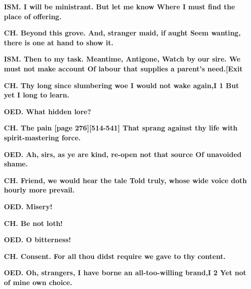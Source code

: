 \documentclass[11pt,letter]{book}
\begin{document}
\par \textbf{ISM. I will be ministrant. But let me know Where I must find the place of offering.}
\par 

\par \textbf{CH. Beyond this grove. And, stranger maid, if aught Seem wanting, there is one at hand to show it.}
\par 

\par \textbf{ISM. Then to my task. Meantime, Antigone, Watch by our sire. We must not make account Of labour that supplies a parent’s need.[Exit}
\par 

\par \textbf{CH. Thy long since slumbering woe I would not wake again,I 1 But yet I long to learn.}
\par 

\par \textbf{OED. What hidden lore?}
\par 

\par \textbf{CH. The pain [page 276][514-541] That sprang against thy life with spirit-mastering force.}
\par 

\par \textbf{OED. Ah, sirs, as ye are kind, re-open not that source Of unavoided shame.}
\par 

\par \textbf{CH. Friend, we would hear the tale Told truly, whose wide voice doth hourly more prevail.}
\par 

\par \textbf{OED. Misery!}
\par 

\par \textbf{CH. Be not loth!}
\par 

\par \textbf{OED. O bitterness!}
\par 

\par \textbf{CH. Consent. For all thou didst require we gave to thy content.}
\par 

\par \textbf{OED. Oh, strangers, I have borne an all-too-willing brand,I 2 Yet not of mine own choice.}
\par 
\end{document}
